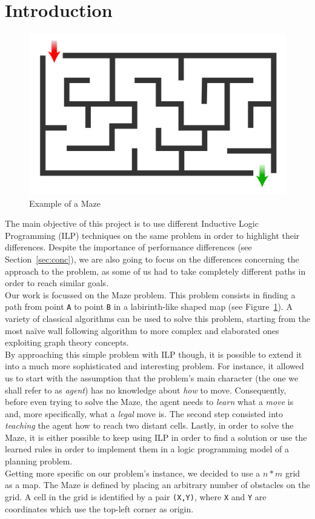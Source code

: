 \section{Introduction}\label{sec:intro}

\begin{figure}[b]
    \centering
    \includegraphics[scale=0.1]{img/Maze_simple.svg.png}
    \caption{Example of a Maze}\label{fig:fig1}
\end{figure}

The main objective of this project is to use different Inductive Logic Programming (ILP) techniques on the same problem in order to highlight
their differences. Despite the importance of performance differences (see Section~\ref{sec:conc}), we are also going to focus on the differences
concerning the approach to the problem, as some of us had to take completely different paths in order to reach similar goals.\\

Our work is focussed on the Maze problem. This problem consists in finding a path from point \texttt{A}
to point \texttt{B} in a labirinth-like shaped map (see Figure~\ref{fig:fig1}). A variety of classical algorithms
can be used to solve this problem, starting from the most naïve wall following algorithm to more complex and elaborated
ones exploiting graph theory concepts.\\
By approaching this simple problem with ILP though, it is possible to extend it into a much more sophisticated and interesting
problem. For instance, it allowed us to start with the assumption that the problem's main character (the
one we shall refer to as \emph{agent}) has no knowledge about \emph{how} to move. Consequently, before even trying
to solve the Maze, the agent needs to \emph{learn} what a \emph{move} is and, more specifically, what a \emph{legal} move is. The second
step consisted into \emph{teaching} the agent how to reach two distant cells. Lastly, in order to solve the Maze, it is either possible
to keep using ILP in order to find a solution or use the learned rules in order to implement them in a logic programming model of a planning
problem.\\

Getting more specific on our problem's instance, we decided to use a \(n * m\) grid as a map. The Maze is defined by placing an arbitrary number
of obstacles on the grid. A cell in the grid is identified by a pair \texttt{(X,Y)}, where \texttt{X} and \texttt{Y} are coordinates which use the
top-left corner as origin.
